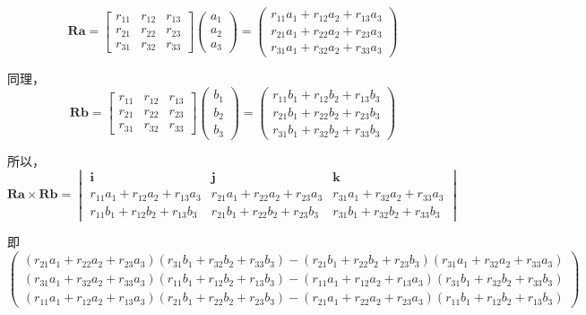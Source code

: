 \documentclass{homework}
\begin{document}
\begin{sol}
  \[
    \mathbf{R} \mathbf{a} = 
    \begin{bmatrix}
      r_{11} & r_{12} & r_{13} \\
      r_{21} & r_{22} & r_{23} \\
      r_{31} & r_{32} & r_{33}
    \end{bmatrix}
    \begin{pmatrix}  
      a_1 \\
      a_2 \\
      a_3
    \end{pmatrix}
    =
    \begin{pmatrix}  
      r_{11} a_1 + r_{12} a_2 + r_{13} a_3 \\
      r_{21} a_1 + r_{22} a_2 + r_{23} a_3 \\
      r_{31} a_1 + r_{32} a_2 + r_{33} a_3 
    \end{pmatrix}
  \]

  同理，
  \[
    \mathbf{R} \mathbf{b} = 
    \begin{bmatrix}
      r_{11} & r_{12} & r_{13} \\
      r_{21} & r_{22} & r_{23} \\
      r_{31} & r_{32} & r_{33}
    \end{bmatrix}
    \begin{pmatrix}  
      b_1 \\
      b_2 \\
      b_3
    \end{pmatrix}
    =
    \begin{pmatrix}  
      r_{11} b_1 + r_{12} b_2 + r_{13} b_3 \\
      r_{21} b_1 + r_{22} b_2 + r_{23} b_3 \\
      r_{31} b_1 + r_{32} b_2 + r_{33} b_3 
    \end{pmatrix}
  \]

  所以，
  \[
    \mathbf{R} \mathbf{a} \times \mathbf{R} \mathbf{b} = 
    \begin{vmatrix}
      \mathbf{i} & \mathbf{j} & \mathbf{k} \\
      r_{11} a_1 + r_{12} a_2 + r_{13} a_3 & r_{21} a_1 + r_{22} a_2 + r_{23} a_3 & r_{31} a_1 + r_{32} a_2 + r_{33} a_3 \\
      r_{11} b_1 + r_{12} b_2 + r_{13} b_3 & r_{21} b_1 + r_{22} b_2 + r_{23} b_3 & r_{31} b_1 + r_{32} b_2 + r_{33} b_3
    \end{vmatrix}
  \]

  即
  \[
    \begin{pmatrix}  
      (r_{21} a_1 + r_{22} a_2 + r_{23} a_3)(r_{31} b_1 + r_{32} b_2 + r_{33} b_3) - (r_{21} b_1 + r_{22} b_2 + r_{23} b_3)(r_{31} a_1 + r_{32} a_2 + r_{33} a_3) \\
      (r_{31} a_1 + r_{32} a_2 + r_{33} a_3)(r_{11} b_1 + r_{12} b_2 + r_{13} b_3) - (r_{11} a_1 + r_{12} a_2 + r_{13} a_3)(r_{31} b_1 + r_{32} b_2 + r_{33} b_3) \\
      (r_{11} a_1 + r_{12} a_2 + r_{13} a_3)(r_{21} b_1 + r_{22} b_2 + r_{23} b_3) - (r_{21} a_1 + r_{22} a_2 + r_{23} a_3)(r_{11} b_1 + r_{12} b_2 + r_{13} b_3)
    \end{pmatrix}
  \]


\end{sol}
\end{document}
